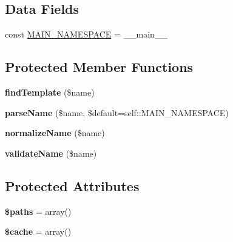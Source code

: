 \subsection*{Data Fields}
\begin{DoxyCompactItemize}
\item 
const \hyperlink{class_twig___loader___filesystem_af41bf3185112b600125464a5972ecf38}{M\+A\+I\+N\+\_\+\+N\+A\+M\+E\+S\+P\+A\+C\+E} = \textquotesingle{}\+\_\+\+\_\+main\+\_\+\+\_\+\textquotesingle{}
\end{DoxyCompactItemize}
\subsection*{Protected Member Functions}
\begin{DoxyCompactItemize}
\item 
\hypertarget{class_twig___loader___filesystem_a7e542943cb0ed5976c2ae6052254af6b}{}{\bfseries find\+Template} (\$name)\label{class_twig___loader___filesystem_a7e542943cb0ed5976c2ae6052254af6b}

\item 
\hypertarget{class_twig___loader___filesystem_ad069239b3add1abec2c37e1b1f51cc5d}{}{\bfseries parse\+Name} (\$name, \$default=self\+::\+M\+A\+I\+N\+\_\+\+N\+A\+M\+E\+S\+P\+A\+C\+E)\label{class_twig___loader___filesystem_ad069239b3add1abec2c37e1b1f51cc5d}

\item 
\hypertarget{class_twig___loader___filesystem_a565b09107e424878dd2adaa4231ad84d}{}{\bfseries normalize\+Name} (\$name)\label{class_twig___loader___filesystem_a565b09107e424878dd2adaa4231ad84d}

\item 
\hypertarget{class_twig___loader___filesystem_a37f7944f8c6847126c5ef65e189f84b3}{}{\bfseries validate\+Name} (\$name)\label{class_twig___loader___filesystem_a37f7944f8c6847126c5ef65e189f84b3}

\end{DoxyCompactItemize}
\subsection*{Protected Attributes}
\begin{DoxyCompactItemize}
\item 
\hypertarget{class_twig___loader___filesystem_a20dd412769e0754189f5ce036e857a37}{}{\bfseries \$paths} = array()\label{class_twig___loader___filesystem_a20dd412769e0754189f5ce036e857a37}

\item 
\hypertarget{class_twig___loader___filesystem_ac2dc76d756ec398393d4b1d23659276c}{}{\bfseries \$cache} = array()\label{class_twig___loader___filesystem_ac2dc76d756ec398393d4b1d23659276c}

\end{DoxyCompactItemize}


